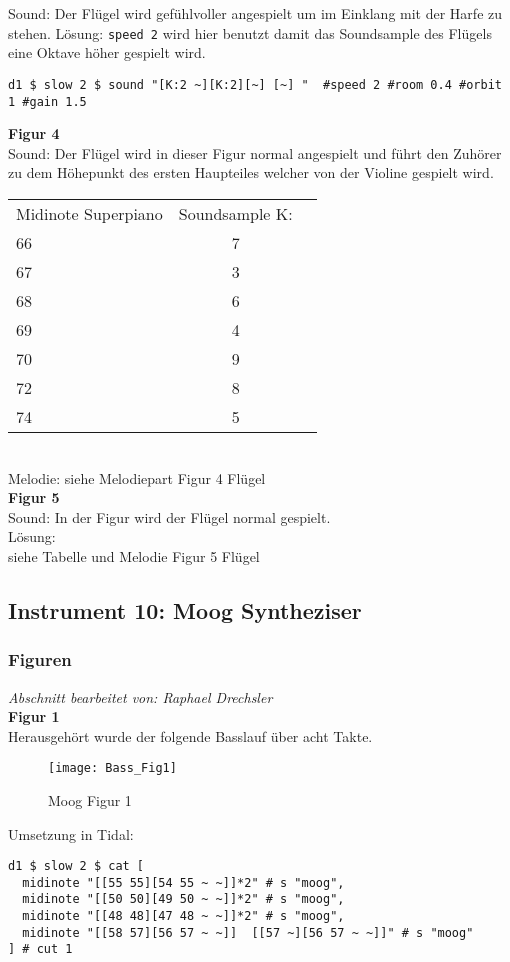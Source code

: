 \documentclass[
10pt, %
a4paper, %
oneside, %
headinclude,footinclude, %
BCOR5mm, %
]{scrartcl}
\begin{document}
Sound: Der Flügel wird gefühlvoller angespielt um im Einklang mit der Harfe zu stehen.
Lösung: \verb|speed 2| wird hier benutzt damit das Soundsample des Flügels eine Oktave höher gespielt wird.
\begin{lstlisting}
d1 $ slow 2 $ sound "[K:2 ~][K:2][~] [~] "  #speed 2 #room 0.4 #orbit 1 #gain 1.5
\end{lstlisting}
\noindent \textbf{Figur 4}\\
Sound: Der Flügel wird in dieser Figur normal angespielt und führt den Zuhörer zu dem Höhepunkt des ersten Haupteiles welcher von der Violine gespielt wird.\\
\begin{tabular}{lcr}
Midinote Superpiano & Soundsample K: \\ 
66&7\\
67&3\\
68&6\\
69&4\\
70&9\\
72&8\\
74&5\\
\end{tabular}
\\
Melodie: siehe Melodiepart Figur 4 Flügel\\
\noindent \textbf{Figur 5}\\
Sound: In der Figur wird der Flügel normal gespielt.\\
Lösung:\\
siehe Tabelle und Melodie Figur 5 Flügel

\subsection{Instrument 10: Moog Syntheziser}
\subsubsection{Figuren}
\textit{Abschnitt bearbeitet von: Raphael Drechsler}\\

\noindent\textbf{Figur 1}\\
Herausgehört wurde der folgende Basslauf über acht Takte.\\
\begin{figure}[h]
	\centering 
	\texttt{[image: Bass\_Fig1]} 
	\caption{Moog Figur 1}
\end{figure}

\noindent Umsetzung in Tidal:
\begin{lstlisting}
d1 $ slow 2 $ cat [
  midinote "[[55 55][54 55 ~ ~]]*2" # s "moog",
  midinote "[[50 50][49 50 ~ ~]]*2" # s "moog",
  midinote "[[48 48][47 48 ~ ~]]*2" # s "moog",
  midinote "[[58 57][56 57 ~ ~]]  [[57 ~][56 57 ~ ~]]" # s "moog" 
] # cut 1
\end{lstlisting}
\end{document}
